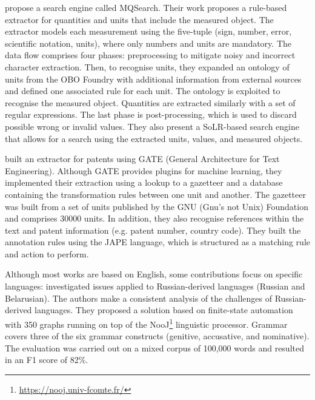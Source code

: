 \cite{maiya2015mining} propose a search engine called MQSearch. Their work proposes a rule-based extractor for quantities and units that include the measured object. The extractor models each measurement using the five-tuple (sign, number, error, scientific notation, units), where only numbers and units are mandatory. 
The data flow comprises four phases: preprocessing to mitigate noisy and incorrect character extraction. 
Then, to recognise units, they expanded an ontology of units from the OBO Foundry with additional information from external sources and defined one associated rule for each unit. The ontology is exploited to recognise the measured object. 
Quantities are extracted similarly with a set of regular expressions. 
The last phase is post-processing, which is used to discard possible wrong or invalid values. 
They also present a SoLR-based search engine that allows for a search using the extracted units, values, and measured objects. 

\cite{agatonovic2008large} built an extractor for patents using GATE (General Architecture for Text Engineering). 
Although GATE provides plugins for machine learning, they implemented their extraction using a lookup to a gazetteer and a database containing the transformation rules between one unit and another. 
The gazetteer was built from a set of units published by the GNU (Gnu's not Unix) Foundation and comprises 30000 units. In addition, they also recognise references within the text and patent information (e.g. patent number, country code). 
They built the annotation rules using the JAPE language, which is structured as a matching rule and action to perform. 

Although most works are based on English, some contributions focus on specific languages: \cite{hetsevich2014processing} investigated issues applied to Russian-derived languages (Russian and Belarusian). 
The authors make a consistent analysis of the challenges of Russian-derived languages. 
They proposed a solution based on finite-state automation with 350 graphs running on top of the NooJ\footnote{\url{https://nooj.univ-fcomte.fr/}} linguistic processor. 
Grammar covers three of the six grammar constructs (genitive, accusative, and nominative). 
The evaluation was carried out on a mixed corpus of 100,000 words and resulted in an F1 score of 82\%. 

